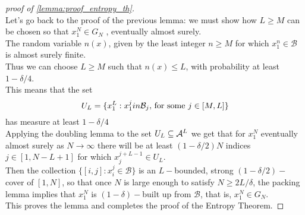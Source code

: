 \begin{proof}[proof of \ref{lemma:proof_entropy_th}]
\hfill \\
    Let’s go back to the proof of the previous lemma: we must show how $L \geq M$ can be chosen so that $x_1^N \in G_N$ , eventually almost surely.
    \\The random variable $n(x)$, given by the least integer $n \geq M$ for which $x_1^n \in \mathcal{B}$ is almost surely finite.
    \\Thus we can choose $L \geq M$ such that $n(x) \leq L$, with probability at least $1 - \delta/4$.
    \\This means that the set 
    \begin{equation*}
        U_L = \{ x_1^L : x_1^j \\in \mathcal{B}_j, \, \text{for some $j \in [M, L]$} \}
    \end{equation*}
    has measure at least $1 - \delta/4$
    \\Applying the doubling lemma to the set $U_L \subseteq \mathcal{A}^L$ we get that for $x_1^N$ eventually almost surely as $N \rightarrow \infty$ there will be at least $(1 - \delta/2)N$ indices $j \in [1, N-L+1]$ for which $x_j^{j+L-1} \in U_L$.
    \\Then the collection $\{ [i,j] : x_i^j \in \mathcal{B} \}$ is an $L-$bounded, strong $(1- \delta/2)-$cover of $[1,N]$, so that once $N$ is large enough to satisfy $N \geq 2L/\delta$, the packing lemma implies that $x_1^N$ is $(1 -\delta)-$built up from $\mathcal{B}$, that is, $x_1^N \in G_N$.
    \\This proves the lemma and completes the proof of the Entropy Theorem.
\end{proof}

